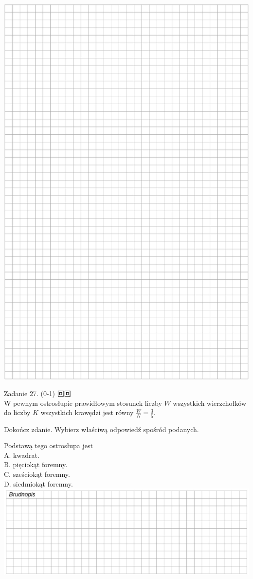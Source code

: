 \documentclass[10pt]{article}
\begin{document}
\includegraphics[max width=\textwidth, center]{2024_11_21_51cb67544fb9b029f01cg-23}

Zadanie 27. (0-1) 回回\\
W pewnym ostrosłupie prawidłowym stosunek liczby \(W\) wszystkich wierzchołków do liczby \(K\) wszystkich krawędzi jest równy \(\frac{W}{K}=\frac{3}{5}\).

Dokończ zdanie. Wybierz właściwą odpowiedź spośród podanych.

Podstawą tego ostrosłupa jest\\
A. kwadrat.\\
B. pięciokąt foremny.\\
C. sześciokąt foremny.\\
D. siedmiokąt foremny.\\
\includegraphics[max width=\textwidth, center]{2024_11_21_51cb67544fb9b029f01cg-24(1)}
\end{document}

